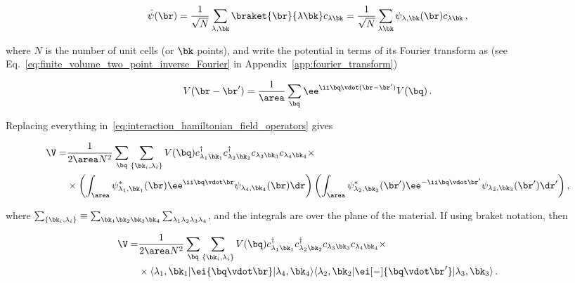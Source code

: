 \begin{equation}
    \hat{\psi}(\br)=\frac{1}{\sqrt{N}}\sum_{\lambda, \bk}\braket{\br}{\lambda \bk} c_{\lambda \bk}=\frac{1}{\sqrt{N}}\sum_{\lambda \bk}\psi_{\lambda, \bk}(\br)c_{\lambda \bk}\,,
\end{equation}

\noindent where $N$ is the number of unit cells (or $\bk$ points), and write the potential in terms of its Fourier transform as (see Eq.~\eqref{eq:finite_volume_two_point_inverse_Fourier} in Appendix~\ref{app:fourier_transform})

\begin{equation}
    V (\br - \br') = \frac{1}{\area} \sum_{\bq} \ee^{\ii \bq \vdot(\br-\br')} V(\bq)\,.
\end{equation}

\noindent Replacing everything in~\eqref{eq:interaction_hamiltonian_field_operators} gives

\begin{equation}
    \label{eq:interaction_hamiltonian_momentum_space_substitution}
    \begin{aligned}
        \V = & \frac{1}{2 \area N^{2}} \sum_{\bq} \sum_{\{\bk_{i},\lambda_i\}} V(\bq) c^{\dagger}_{\lambda_1 \bk_1} c^{\dagger}_{\lambda_2 \bk_2} c_{\lambda_3 \bk_3} c_{\lambda_4 \bk_4} \times \\
                  & \times \left(\int_{\area} \psi_{\lambda_{1}, \bk_{1}}^{*}(\br) \ee^{\ii \bq \vdot \br}\psi_{\lambda_4, \bk_4}(\br) \dr \right) \left(\int_{\area} \psi_{\lambda_2, \bk_2}^{*}(\br') \ee^{-\ii \bq \vdot \br'} \psi_{\lambda_3, \bk_3}(\br') \dr' \right),
    \end{aligned}
\end{equation}

\noindent where $\sum_{\{\bk_{i},\lambda_i\}} \equiv \sum_{\bk_1 \bk_2 \bk_3 \bk_4} \sum_{\lambda_1 \lambda_2 \lambda_3 \lambda_4}$, and the integrals are over the plane of the material.
If using braket notation, then

\begin{equation}
    \label{eq:interaction_hamiltonian_momentum_space_substitution_option_2}
    \begin{aligned}
        \V = & \frac{1}{2 \area N^{2}}  \sum_{\bq} \sum_{\{\bk_{i},\lambda_i\}} V(\bq) c^{\dagger}_{\lambda_1 \bk_1} c^{\dagger}_{\lambda_2 \bk_2} c_{\lambda_3 \bk_3} c_{\lambda_4 \bk_4} \times \\
                  &  \times \langle \lambda_1, \bk_1 |\ei{\bq \vdot \br} | \lambda_4, \bk_4 \rangle  \langle \lambda_2, \bk_2 | \ei[-]{\bq \vdot \br'} | \lambda_3, \bk_3 \rangle \,. %
    \end{aligned}
\end{equation}

